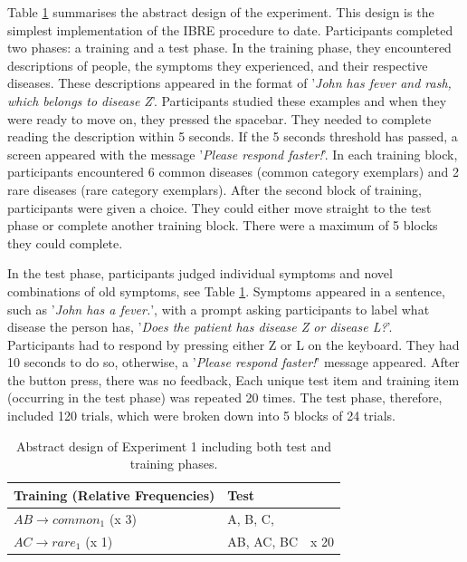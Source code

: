 \documentclass[10pt,letterpaper]{article}
\begin{document}
Table \ref{tab:abstract-exp1} summarises the abstract design of the experiment.
This design is the simplest implementation of the IBRE procedure to date.
Participants completed two phases: a training and a test phase.
In the training phase, they encountered descriptions of people, the symptoms they experienced, and their respective diseases.
These descriptions appeared in the format of '\textit{John has fever and rash, which belongs to disease Z}'.
Participants studied these examples and when they were ready to move on, they pressed the spacebar.
They needed to complete reading the description within 5 seconds.
If the 5 seconds threshold has passed, a screen appeared with the message '\textit{Please respond faster!}'.
In each training block, participants encountered 6 common diseases (common category exemplars) and 2 rare diseases (rare category exemplars).
After the second block of training, participants were given a choice.
They could either move straight to the test phase or complete another training block.
There were a maximum of 5 blocks they could complete.

In the test phase, participants judged individual symptoms and novel combinations of old symptoms, see Table \ref*{tab:abstract-exp1}.
Symptoms appeared in a sentence, such as '\textit{John has a fever.}', with a prompt asking participants to label what disease the person has, '\textit{Does the patient has disease Z or disease L?}'.
Participants had to respond by pressing either Z or L on the keyboard.
They had 10 seconds to do so, otherwise, a '\textit{Please respond faster!}' message appeared.
After the button press, there was no feedback,
Each unique test item and training item (occurring in the test phase) was repeated 20 times.
The test phase, therefore, included 120 trials, which were broken down into 5 blocks of 24 trials.

\begin{table}[!ht]
  \begin{center}
    \caption{Abstract design of Experiment 1 including both test and training phases. \\}
    \label{tab:abstract-exp1}
    \begin{tabular}{llr} %
      \textbf{Training (Relative Frequencies)} & \textbf{Test}& \\
      \hline
      $AB \to common_{1}$ (x 3) &  A, B, C,         &  \\
      $AC \to rare_{1}$   (x 1) &  AB, AC, BC      & x 20 \\
      \hline
    \end{tabular}
  \end{center}
\end{table}
\end{document}

